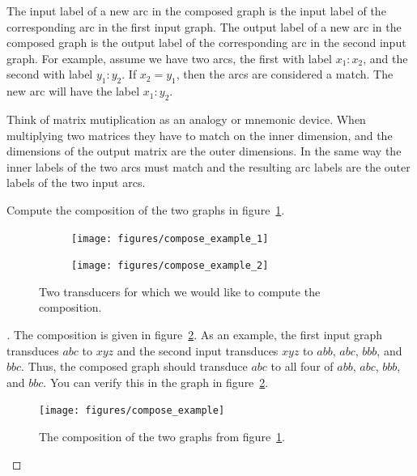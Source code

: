 The input label of a new arc in the composed graph is the input label of the
corresponding arc in the first input graph. The output label of a new arc in
the composed graph is the output label of the corresponding arc in the second
input graph. For example, assume we have two arcs, the first with label
$x_1\!:\!x_2$, and the second with label $y_1\!:\!y_2$. If $x_2 = y_1$, then
the arcs are considered a match. The new arc will have the label $x_1\!:\!y_2$.

Think of matrix mutiplication as an analogy or mnemonic device. When
multiplying two matrices they have to match on the inner dimension, and the
dimensions of the output matrix are the outer dimensions. In the same way the
inner labels of the two arcs must match and the resulting arc labels are the
outer labels of the two input arcs.

\begin{example}
Compute the composition of the two graphs in
figure~\ref{fig:compose_example_inputs}.
\end{example}

\begin{figure}
    \centering
    \begin{subfigure}[b]{0.3\textwidth}
        \centering
        \texttt{[image: figures/compose\_example\_1]}
    \end{subfigure}
    \begin{subfigure}[b]{0.68\textwidth}
        \centering
        \texttt{[image: figures/compose\_example\_2]}
    \end{subfigure}
    \caption{Two transducers for which we would like to compute the composition.}
    \label{fig:compose_example_inputs}
\end{figure}

\begin{proof}[\unskip\nopunct]
The composition is given in figure~\ref{fig:compose_example}. As an example,
the first input graph transduces $abc$ to $xyz$ and the second input
transduces $xyz$ to $abb$, $abc$, $bbb$, and $bbc$. Thus, the composed
graph should transduce $abc$ to all four of $abb$, $abc$, $bbb$, and $bbc$.
You can verify this in the graph in figure~\ref{fig:compose_example}.

\begin{figure}
    \centering
    \texttt{[image: figures/compose\_example]}
    \caption{The composition of the two graphs from
    figure~\ref{fig:compose_example_inputs}.}
    \label{fig:compose_example}
\end{figure}

\end{proof}

